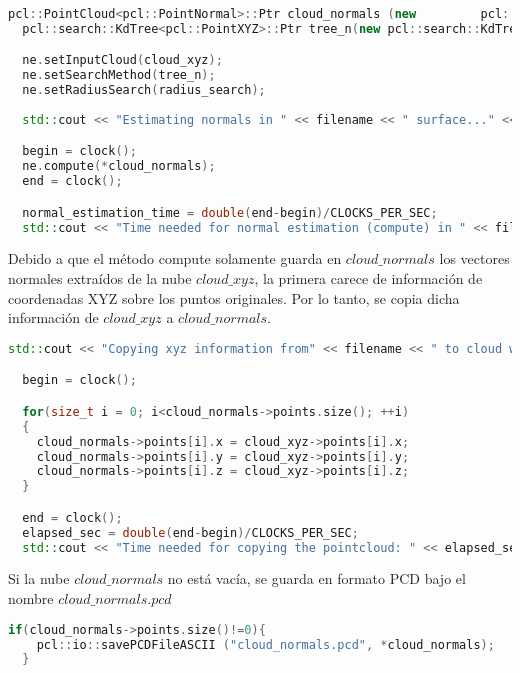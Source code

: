 \begin{lstlisting}[language=C++,breaklines]
  pcl::PointCloud<pcl::PointNormal>::Ptr cloud_normals (new 		pcl::PointCloud<pcl::PointNormal>);
  pcl::search::KdTree<pcl::PointXYZ>::Ptr tree_n(new pcl::search::KdTree<pcl::PointXYZ>());

  ne.setInputCloud(cloud_xyz);
  ne.setSearchMethod(tree_n);
  ne.setRadiusSearch(radius_search);
 
  std::cout << "Estimating normals in " << filename << " surface..." <<std::endl;

  begin = clock();
  ne.compute(*cloud_normals);
  end = clock();

  normal_estimation_time = double(end-begin)/CLOCKS_PER_SEC;
  std::cout << "Time needed for normal estimation (compute) in " << filename << ": " << normal_estimation_time << " seconds" << std::endl << std::endl;
\end{lstlisting}
  
Debido a que el método compute solamente guarda en $cloud\_normals$ los vectores normales extraídos de la nube $cloud\_xyz$, la primera carece de información de coordenadas XYZ sobre los puntos originales. Por lo tanto, se copia dicha información de $cloud\_xyz$ a $cloud\_normals$.

\begin{lstlisting}[language=C++,breaklines]
  std::cout << "Copying xyz information from" << filename << " to cloud with normals information..." << std::endl;

  begin = clock();

  for(size_t i = 0; i<cloud_normals->points.size(); ++i)
  {
  	cloud_normals->points[i].x = cloud_xyz->points[i].x;
  	cloud_normals->points[i].y = cloud_xyz->points[i].y;
  	cloud_normals->points[i].z = cloud_xyz->points[i].z;
  }

  end = clock();
  elapsed_sec = double(end-begin)/CLOCKS_PER_SEC;
  std::cout << "Time needed for copying the pointcloud: " << elapsed_sec <<" seconds" << std::endl << std::endl;
\end{lstlisting}

  Si la nube $cloud\_normals$ no está vacía, se guarda en formato PCD bajo el nombre $cloud\_normals.pcd$
  
\begin{lstlisting}[language=C++,breaklines]
  if(cloud_normals->points.size()!=0){
  	pcl::io::savePCDFileASCII ("cloud_normals.pcd", *cloud_normals);
  }
\end{lstlisting}

